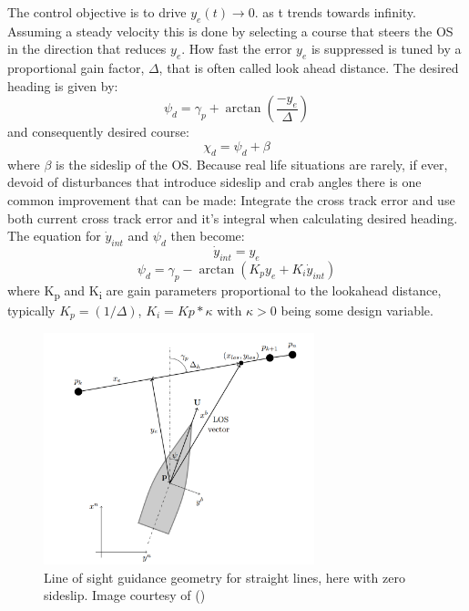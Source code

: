 The control objective is to drive $y_{e}(t) \rightarrow 0.$ as t trends towards infinity. Assuming a steady velocity this is done by
selecting a course that steers the \gls{OS} in the direction that reduces $y_e$. How fast the error $y_e$ is suppressed is
tuned by a proportional gain factor, $\varDelta$, that is often called look ahead distance. The desired heading is given by:
\begin{equation} %
    \psi_d = \gamma_p + \arctan(\frac{-y_e}{\varDelta})
\end{equation}
and consequently desired course:
\begin{equation}
    \chi_d = \psi_d + \beta
\end{equation}
where $\beta$ is the sideslip of the \gls{OS}. Because real life situations are rarely, if ever, devoid of disturbances that introduce
sideslip and crab angles there is one common improvement that can be made: Integrate the cross track error and use both current cross track error
and it's integral when calculating desired heading. The equation for $\dot{y}_{int}$ and $\psi_d$ then become:
\begin{equation}
    \dot{y}_{int} = y_e
\end{equation}
\begin{equation}
    \psi_d = \gamma_p - \arctan(K_{p}y_e + K_{i}\dot{y}_{int})
\end{equation}
where K\textsubscript{p} and K\textsubscript{i} are gain parameters proportional to the lookahead distance, typically $K_p = (1/\varDelta)$, $K_i = Kp*\kappa$
with $\kappa > 0$ being some design variable.

\begin{figure}
    \centering
    \includegraphics[width = 0.7\textwidth]{Images/LOS_decomp.png}
    \caption{Line of sight guidance geometry for straight lines, here with zero sideslip. Image courtesy of (\cite{lekkas2013line})} %
    \label{FIG: LOS_decomp}
\end{figure}

